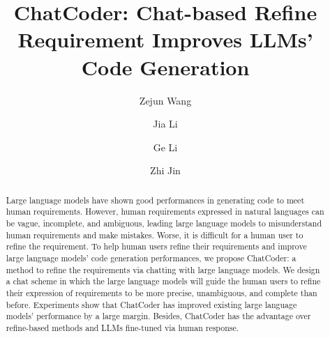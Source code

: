 \documentclass[sigconf]{acmart}
\begin{document}
\title{ChatCoder: Chat-based Refine Requirement Improves LLMs' Code Generation}


\author{Zejun Wang}

\author{Jia Li}

\author{Ge Li}

\author{Zhi Jin}

\renewcommand{\shortauthors}{}

\begin{abstract}
Large language models have shown good performances in generating code to meet human requirements. However, human requirements expressed in natural languages can be vague, incomplete, and ambiguous, leading large language models to misunderstand human requirements and make mistakes. Worse, it is difficult for a human user to refine the requirement. To help human users refine their requirements and improve large language models' code generation performances, we propose ChatCoder: a method to refine the requirements via chatting with large language models. We design a chat scheme in which the large language models will guide the human users to refine their expression of requirements to be more precise, unambiguous, and complete than before. Experiments show that ChatCoder has improved existing large language models' performance by a large margin. Besides, ChatCoder has the advantage over refine-based methods and LLMs fine-tuned via human response.
\end{abstract}
\end{document}
